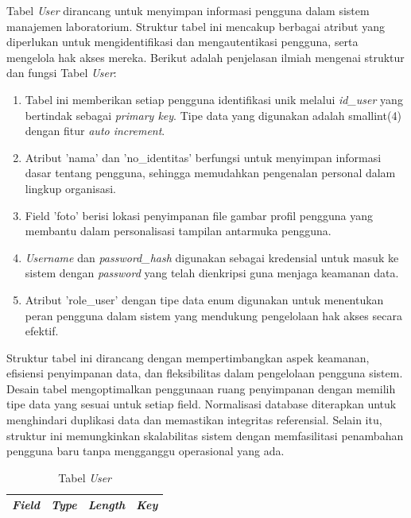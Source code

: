 \begin{enumerate}
	      Tabel \textit{User} dirancang untuk menyimpan informasi pengguna dalam sistem manajemen laboratorium. Struktur tabel ini mencakup berbagai atribut yang diperlukan untuk mengidentifikasi dan mengautentikasi pengguna, serta mengelola hak akses mereka. Berikut adalah penjelasan ilmiah mengenai struktur dan fungsi Tabel \textit{User}:

	      \begin{enumerate}[label=\alph*.]
		      \item Tabel ini memberikan setiap pengguna identifikasi unik melalui \textit{id\_user} yang bertindak sebagai \textit{primary key}. Tipe data yang digunakan adalah smallint(4) dengan fitur \textit{auto increment}.
		      \item Atribut 'nama' dan 'no\_identitas' berfungsi untuk menyimpan informasi dasar tentang pengguna, sehingga memudahkan pengenalan personal dalam lingkup organisasi.
		      \item Field 'foto' berisi lokasi penyimpanan file gambar profil pengguna yang membantu dalam personalisasi tampilan antarmuka pengguna.
		      \item \textit{Username} dan \textit{password\_hash} digunakan sebagai kredensial untuk masuk ke sistem dengan \textit{password} yang telah dienkripsi guna menjaga keamanan data.
		      \item Atribut 'role\_user' dengan tipe data enum digunakan untuk menentukan peran pengguna dalam sistem yang mendukung pengelolaan hak akses secara efektif.
	      \end{enumerate}

	      Struktur tabel ini dirancang dengan mempertimbangkan aspek keamanan, efisiensi penyimpanan data, dan fleksibilitas dalam pengelolaan pengguna sistem. Desain tabel mengoptimalkan penggunaan ruang penyimpanan dengan memilih tipe data yang sesuai untuk setiap field. Normalisasi database diterapkan untuk menghindari duplikasi data dan memastikan integritas referensial. Selain itu, struktur ini memungkinkan skalabilitas sistem dengan memfasilitasi penambahan pengguna baru tanpa mengganggu operasional yang ada.

		      {
			      \selectfont
			      \begin{longtable}{l l l l}
				      \caption{Tabel \textit{User}}
				      \label{admin}                                                                                       \\
				      \hline
				      \textbf{\textit{Field}} & \textbf{\textit{Type}} & \textbf{\textit{Length}} & \textbf{\textit{Key}} \\
				      \hline
				      \endfirsthead


\end{longtable}}
\end{enumerate}
